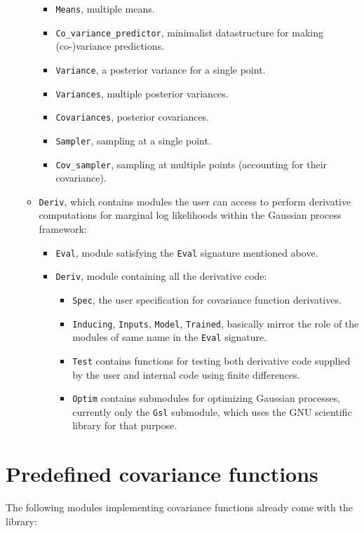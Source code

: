 \documentclass[10pt]{report}
\begin{document}
\begin{itemize}
\begin{itemize}
\begin{itemize}
\item \verb=Means=, multiple means.
\item \verb=Co_variance_predictor=, minimalist datastructure for making
(co-)variance predictions.
\item \verb=Variance=, a posterior variance for a single point.
\item \verb=Variances=, multiple posterior variances.
\item \verb=Covariances=, posterior covariances.
\item \verb=Sampler=, sampling at a single point.
\item \verb=Cov_sampler=, sampling at multiple points (accounting for their
covariance).
\end{itemize}
\item \verb=Deriv=, which contains modules the user can access to perform
derivative computations for marginal log likelihoods within the Gaussian process
framework:
\begin{itemize}
\item \verb=Eval=, module satisfying the \verb=Eval= signature mentioned above.
\item \verb=Deriv=, module containing all the derivative code:
\begin{itemize}
\item \verb=Spec=, the user specification for covariance function derivatives.
\item \verb=Inducing=, \verb=Inputs=, \verb=Model=, \verb=Trained=, basically
mirror the role of the modules of same name in the \verb=Eval= signature.
\item \verb=Test= contains functions for testing both derivative code supplied
by the user and internal code using finite differences.
\item \verb=Optim= contains submodules for optimizing Gaussian processes,
currently only the \verb=Gsl= submodule, which uses the GNU scientific library
for that purpose.
\end{itemize}
\end{itemize}
\end{itemize}
\end{itemize}

\section{Predefined covariance functions}

The following modules implementing covariance functions already come with the
library:
\end{document}
